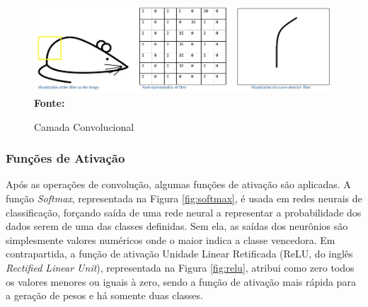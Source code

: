 \begin{figure}[ht]
 	\centering	
 	\caption[\hspace{0.1cm}Grade Computacional.]{Camada Convolucional}
 	\vspace{-0.4cm}
 	\includegraphics[width=1\textwidth]{figuras/conv.png}
 	\captionsetup{justification=centering}
	\vspace{-0.2cm}
     \\\textbf{\footnotesize Fonte: \cite{cnns}}
	\label{fig:conv2}
\end{figure}


\subsubsection{\esp Funções de Ativação} \label{funcAtiv}

Após as operações de convolução, algumas funções de ativação são aplicadas. A função \textit{Softmax}, representada na Figura \ref{fig:softmax}, é usada em redes neurais de classificação, forçando saída de uma rede neural a representar a probabilidade dos dados serem de uma das classes definidas. Sem ela, as saídas dos neurônios são simplesmente valores numéricos onde o maior indica a classe vencedora. Em contrapartida, a função de ativação Unidade Linear Retificada (ReLU, do inglês \textit{Rectified Linear Unit}), representada na Figura \ref{fig:relu}, atribui como zero todos os valores menores ou iguais à zero, sendo a função de ativação mais rápida para a geração de pesos e há somente duas classes.

